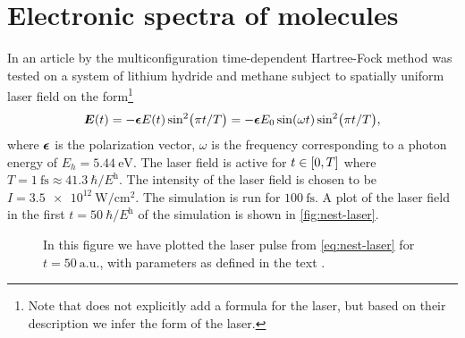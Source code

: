     \section{Electronic spectra of molecules}
        In an article by \citeauthor{nest} \cite{nest} the
        multiconfiguration time-dependent Hartree-Fock method was tested on
        a system of lithium hydride and methane subject to spatially uniform
        laser field on the form\footnote{%
            Note that \citeauthor{nest} \cite{nest} does not explicitly add
            a formula for the laser, but based on their description we infer
            the form of the laser.
        }
        \begin{align}
            \boldsymbol{E}(t)
            = -\boldsymbol{\epsilon} E(t)
            \sin[2](\pi t / T)
            = -\boldsymbol{\epsilon} E_0 \sin(\omega t)
            \sin[2](\pi t / T),
            \label{eq:nest-laser}
        \end{align}
        where $\boldsymbol{\epsilon}$ is the polarization vector, $\omega$ is the
        frequency corresponding to a photon energy of $E_h =
        \SI{5.44}{\electronvolt}$.
        The laser field is active for $t \in \left[ 0, T \right]$ where $T =
        \SI{1}{\femto\second} \approx \SI{41.3}{\planckbar / \hartree}$.
        The intensity of the laser field is chosen to be $I =
        \SI{3.5e12}{\watt/\cm^2}$.
        The simulation is run for $\SI{100}{\femto\second}$.
        A plot of the laser field in the first $t = \SI{50}{\planckbar /
        \hartree}$ of the simulation is shown in \autoref{fig:nest-laser}.
        \begin{figure}
            \centering
            \caption{In this figure we have plotted the laser pulse from
            \autoref{eq:nest-laser} for $t = \SI{50}{\text{a.u.}}$, with
            parameters as defined in the text \cite{nest}.}
            \label{fig:nest-laser}
        \end{figure}

